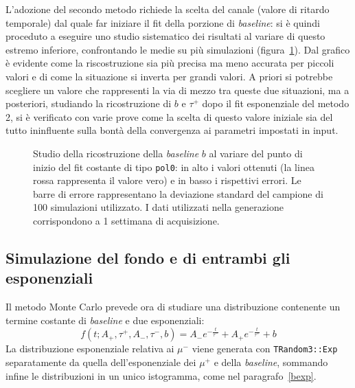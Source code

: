 \documentclass[10pt, oneside, a4paper]{article}   	%
\begin{document}
L'adozione del secondo metodo richiede la scelta del canale (valore di ritardo temporale) dal quale far iniziare il fit della porzione di \textit{baseline}: si è quindi proceduto a eseguire uno studio sistematico dei risultati al variare di questo estremo inferiore, confrontando le medie su più simulazioni (figura~\ref{baselinestart}). Dal grafico è evidente come la riscostruzione sia più precisa ma meno accurata per piccoli valori e di come la situazione si inverta per grandi valori. A priori si potrebbe scegliere un valore che rappresenti la via di mezzo tra queste due situazioni, ma a posteriori, studiando la ricostruzione di $b$ e $\tau^+$ dopo il fit esponenziale del metodo 2, si è verificato con varie prove come la scelta di questo valore iniziale sia del tutto ininfluente sulla bontà della convergenza ai parametri impostati in input.
%
\begin{figure}[h]
  \centerline{}
  \caption{Studio della ricostruzione della \textit{baseline} $b$ al variare del punto di inizio del fit costante di tipo \texttt{pol0}: in alto i valori ottenuti (la linea rossa rappresenta il valore vero) e in basso i rispettivi errori. Le barre di errore rappresentano la deviazione standard del campione di 100 simulazioni utilizzato. I dati utilizzati nella generazione corrispondono a 1 settimana di acquisizione.}\label{baselinestart}
\end{figure}
%
\subsection{Simulazione del fondo e di entrambi gli esponenziali}
Il metodo Monte Carlo prevede ora di studiare una distribuzione contenente un termine costante di \textit{baseline} e due esponenziali:
\begin{equation}
 f(t;A_+,\tau^+,A_-,\tau^-, b)=A_-e^{-\frac{t}{\tau^-}}+A_+e^{-\frac{t}{\tau^+}}+b
 \label{eq::funzione_fit_finale}
\end{equation}
La distribuzione esponenziale relativa ai $\mu^-$ viene generata con \lstinline{TRandom3::Exp} separatamente da quella dell'esponenziale dei $\mu^+$ e della \textit{baseline}, sommando infine le distribuzioni in un unico istogramma, come nel paragrafo~\cref{bexp}. 
\end{document}
